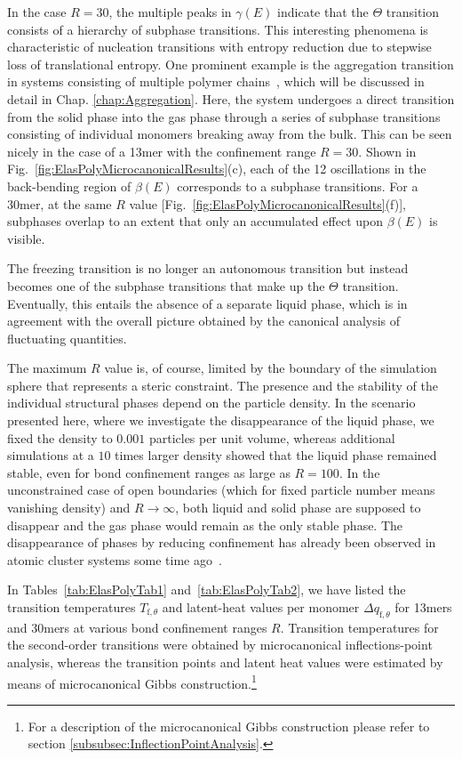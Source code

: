 \documentclass[12pt]{report}
\begin{document}
In the case $R = 30$, the multiple peaks in $\gamma(E)$ indicate that the $\Theta$ transition consists of a hierarchy of subphase transitions. This interesting phenomena is characteristic of nucleation transitions with entropy reduction due to stepwise loss of translational entropy. One prominent example is the aggregation transition in systems consisting of multiple polymer chains~\cite{Bachmann2014,KociAgg2015,Junghans2008,Junghans2009,Junghans2011},
which will be discussed in detail in Chap.\,\,\ref{chap:Aggregation}. Here, the system undergoes a direct transition from the solid phase into the gas phase through a series of subphase transitions consisting of individual monomers breaking away from the bulk.
\newpage
\noindent
This can be seen nicely in the case of a 13mer with the confinement range $R = 30$. Shown in Fig.~\ref{fig:ElasPolyMicrocanonicalResults}(c), each of the 12 oscillations in the back-bending region of $\beta(E)$ corresponds to a subphase transitions. For a 30mer, at the same $R$ value [Fig.~\ref{fig:ElasPolyMicrocanonicalResults}(f)], subphases overlap to an extent that only an accumulated effect upon $\beta(E)$ is visible. 

The freezing transition is no longer an autonomous transition but instead becomes one of the subphase transitions that make up the $\Theta$ transition. Eventually, this entails the absence of a separate liquid phase, which is in agreement with the overall picture obtained by the canonical analysis of fluctuating quantities.

The maximum $R$ value is, of course, limited by the boundary of the simulation sphere that represents a steric constraint. The presence and the stability of the individual structural phases depend on the particle density. In the scenario presented here, where we investigate the disappearance of the liquid phase, we fixed the density to $0.001$ particles per unit volume, whereas additional simulations at a $10$ times larger density showed that the liquid phase remained stable, even for bond confinement ranges as large as $R=100$. In the unconstrained case of open boundaries (which for fixed particle number means vanishing density) and $R\to\infty$, both liquid and solid phase are supposed to disappear and the gas phase would remain as the only stable phase. The disappearance of phases by reducing confinement has already been observed in atomic cluster systems some time ago~\cite{calvo1,calvo2}.

In Tables~\ref{tab:ElasPolyTab1} and~\ref{tab:ElasPolyTab2}, we have listed the transition temperatures $T_{\mathrm{f},\theta}$ and latent-heat values per monomer $\Delta q_{\mathrm{f},\theta}$ for 13mers and 30mers at various bond confinement ranges $R$. Transition temperatures for the second-order transitions were obtained by microcanonical inflections-point analysis, whereas the transition points and latent heat values were estimated by means of microcanonical Gibbs construction.\footnote{For a description of the microcanonical Gibbs construction please refer to section\,\,\ref{subsubsec:InflectionPointAnalysis}.}
%
\end{document}
